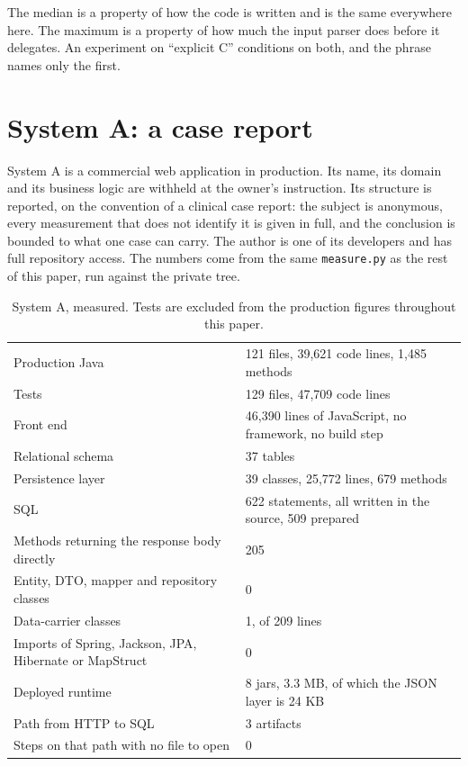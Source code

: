 \documentclass[11pt,a4paper]{article}
\begin{document}
The median is a property of how the code is written and is the same everywhere here. The maximum is a property of how much the input parser does before it delegates. An experiment on ``explicit C'' conditions on both, and the phrase names only the first.

\section{System A: a case report}
\label{sec:case}

System A is a commercial web application in production. Its name, its domain and its business logic are withheld at the owner's instruction. Its structure is reported, on the convention of a clinical case report: the subject is anonymous, every measurement that does not identify it is given in full, and the conclusion is bounded to what one case can carry. The author is one of its developers and has full repository access. The numbers come from the same \texttt{measure.py} as the rest of this paper, run against the private tree.

\begin{table}[H]
\centering
\small
\begin{tabular}{@{}p{7.2cm}l@{}}
\toprule
Production Java & 121 files, 39,621 code lines, 1,485 methods \\
Tests & 129 files, 47,709 code lines \\
Front end & 46,390 lines of JavaScript, no framework, no build step \\
Relational schema & 37 tables \\
Persistence layer & 39 classes, 25,772 lines, 679 methods \\
SQL & 622 statements, all written in the source, 509 prepared \\
Methods returning the response body directly & 205 \\
Entity, DTO, mapper and repository classes & 0 \\
Data-carrier classes & 1, of 209 lines \\
Imports of Spring, Jackson, JPA, Hibernate or MapStruct & 0 \\
Deployed runtime & 8 jars, 3.3 MB, of which the JSON layer is 24 KB \\
Path from HTTP to SQL & 3 artifacts \\
Steps on that path with no file to open & 0 \\
\bottomrule
\end{tabular}
\caption{System A, measured. Tests are excluded from the production figures throughout this paper.}
\label{tab:systema}
\end{table}
\end{document}
